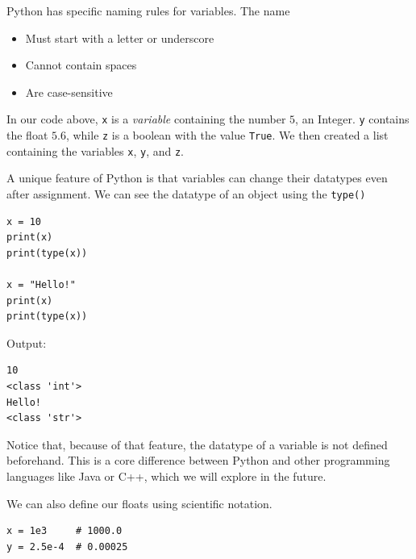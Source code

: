Python has specific naming rules for variables. The name
\begin{itemize}
    \item Must start with a letter or underscore
    \item Cannot contain spaces
    \item Are case-sensitive
\end{itemize}

In our code above, \texttt{x} is a \emph{variable} containing the number $5$, an Integer. \texttt{y} contains the float $5.6$, while \texttt{z} is a boolean with the value \texttt{True}. We then created a list containing the variables \texttt{x}, \texttt{y}, and \texttt{z}.

A unique feature of Python is that variables can change their datatypes even after assignment. We can see the datatype of an object using the \texttt{type()}
\begin{verbatim}
x = 10
print(x)
print(type(x))

x = "Hello!"
print(x)
print(type(x))
\end{verbatim}

Output:
\begin{verbatim}
10
<class 'int'>
Hello!
<class 'str'>
\end{verbatim}

Notice that, because of that feature, the datatype of a variable is not defined beforehand. This is a core difference between Python and other programming languages like Java or C++, which we will explore in the future. 

We can also define our floats using scientific notation.
\begin{verbatim}
x = 1e3     # 1000.0
y = 2.5e-4  # 0.00025
\end{verbatim}

